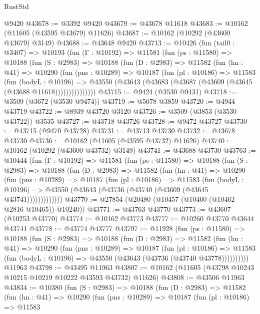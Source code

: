 \begin{lexlean}{RustStd}
\begin{coremodule}
    @9420
@43678 := @3392 @9420
@43679 := @43678 @11618
@43683 := @10162 (@11605 (@43595 @43679) @11626)
@43687 := @10162 (@10292 (@43600 @43679) @3149)
@43688 := @43648 @9420
@43713 := @10426
    (fun (tail0 : @3407) =>
    @10193
      (fun (Γ : @10192) =>
      @11581
        (fun (ps : @11580) =>
        @10188
          (fun (S : @2983) =>
          @10188
            (fun (D : @2983) =>
            @11582
              (fun (hn : @41) =>
              @10290
                (fun (pns : @10289) =>
                @10187
                  (fun (pl : @10186) =>
                  @11583
                    (fun (bodyL : @10196) =>
                    @43550 (@43643 (@43683 (@43687 (@43609 (@43645 (@43688 @11618)))))))))))))))
@43715 := @9424 (@3530 @9431)
@43718 := @3509 (@3672 (@3530 @9474))
@43719 := @5078 @3859
@43720 := @4944 @43719
@43722 := @8939 @43720 @3120
@43726 := @3509 (@3853 (@3530 @43722)) @3535
@43727 := @43718 @43726
@43728 := @9472 @43727
@43730 := @43715 (@9470 @43728)
@43731 := @43713 @43730
@43732 := @43678 @43730
@43736 := @10162 (@11605 (@43595 @43732) @11626)
@43740 := @10162 (@10292 (@43600 @43732) @3149)
@43741 := @43688 @43730
@43763 := @10444
    (fun (Γ : @10192) =>
    @11581
      (fun (ps : @11580) =>
      @10188
        (fun (S : @2983) =>
        @10188
          (fun (D : @2983) =>
          @11582
            (fun (hn : @41) =>
            @10290
              (fun (pns : @10289) =>
              @10187
                (fun (pl : @10186) =>
                @11583
                  (fun (bodyL : @10196) =>
                  @43550 (@43643 (@43736 (@43740 (@43609 (@43645 @43741)))))))))))))
@43770 := @27854 (@20480 (@10457 (@10460 (@10462 @2816 @10465)) @10240))
@43771 := @43763 @43770
@43773 := @43607 (@10253 @43770)
@43774 := @10162 @43773
@43777 := @10260 @43770 @43644 @43741
@43778 := @43774 @43777
@43797 := @11928
    (fun (ps : @11580) =>
    @10188
      (fun (S : @2983) =>
      @10188
        (fun (D : @2983) =>
        @11582
          (fun (hn : @41) =>
          @10290
            (fun (pns : @10289) =>
            @10187
              (fun (pl : @10186) =>
              @11583 (fun (bodyL : @10196) => @43550 (@43643 (@43736 (@43740 @43778))))))))))
    @11963
@43798 := @43495 @11963
@43807 := @10162 (@11605 (@43798 @10243 @10215 @10219 @10222 @43593 @43732) @11626)
@43808 := @43506 @11963
@43834 := @10380
    (fun (S : @2983) =>
    @10188
      (fun (D : @2983) =>
      @11582
        (fun (hn : @41) =>
        @10290
          (fun (pns : @10289) =>
          @10187
            (fun (pl : @10186) =>
            @11583

\end{coremodule}
\end{lexlean}
